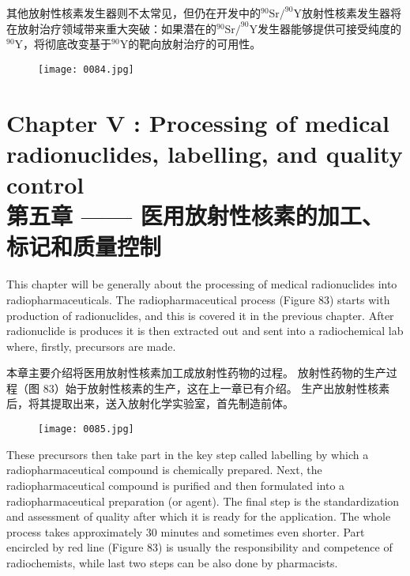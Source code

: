\documentclass[dvipsnames, svgnames,a4paper,11pt]{article}
\begin{document}
其他放射性核素发生器则不太常见，但仍在开发中的$^{90}\text{Sr}/^{90}\text{Y}$放射性核素发生器将在放射治疗领域带来重大突破：如果潜在的$^{90}\text{Sr}/^{90}\text{Y}$发生器能够提供可接受纯度的$^{90}\text{Y}$，将彻底改变基于$^{90}\text{Y}$的靶向放射治疗的可用性。

\begin{figure}[H]
      \centering
      \texttt{[image: 0084.jpg]}
       \label{fig82}
\end{figure}

\newpage

\section{Chapter V : Processing of medical radionuclides, labelling, and quality control\\第五章 —— 医用放射性核素的加工、标记和质量控制}
This chapter will be generally about the processing of medical radionuclides into
radiopharmaceuticals. The radiopharmaceutical process (Figure 83) starts with
production of radionuclides, and this is covered it in the previous chapter. After
radionuclide is produces it is then extracted out and sent into a radiochemical lab
where, firstly, precursors are made.

本章主要介绍将医用放射性核素加工成放射性药物的过程。 放射性药物的生产过程（图 83）始于放射性核素的生产，这在上一章已有介绍。 生产出放射性核素后，将其提取出来，送入放射化学实验室，首先制造前体。

\begin{figure}[H]
    \centering
    \texttt{[image: 0085.jpg]}
     \label{fig83}
\end{figure}

These precursors then take part in the key step called labelling by which a
radiopharmaceutical compound is chemically prepared. Next, the
radiopharmaceutical compound is purified and then formulated into a
radiopharmaceutical preparation (or agent). The final step is the standardization and
assessment of quality after which it is ready for the application. The whole process
takes approximately 30 minutes and sometimes even shorter. Part encircled by red
line (Figure 83) is usually the responsibility and competence of radiochemists, while
last two steps can be also done by pharmacists.
\end{document}
